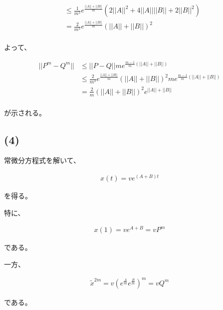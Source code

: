\documentclass[a4paper, 10pt, dvipdfmx]{jlreq}
\begin{document}
\begin{align*}
            & \leq \frac{1}{m^2}e^{\frac{||A||+||B||}{m}} \left(2||A||^2+4||A||||B||+2||B||^2 \right)                                                                                                                                                                                                            \\
            & = \frac{2}{m^2}e^{\frac{||A||+||B||}{m}} \left(||A||+||B||\right)^2                                                                                                                                                                                                                                \\
\end{align*}

よって、

\begin{align*}
    ||P^m-Q^m|| & \leq ||P-Q||m e^{\frac{m-1}{m}(||A||+||B||)}                                                            \\
                & \leq \frac{2}{m^2}e^{\frac{||A||+||B||}{m}} \left(||A||+||B||\right)^2 m e^{\frac{m-1}{m}(||A||+||B||)} \\
                & = \frac{2}{m} \left(||A||+||B||\right)^2 e^{||A||+||B||}                                                \\
\end{align*}

が示される。

\subsection*{(4)}

常微分方程式を解いて、

\begin{align*}
    x(t)=ve^{(A+B)t}
\end{align*}

を得る。

特に、

\begin{align*}
    x(1)=ve^{A+B}=v P^m
\end{align*}

である。

一方、

\begin{align*}
    \tilde{x}^{2m}=v\left(e^{\frac{A}{m}}e^{\frac{B}{m}}\right)^m=vQ^m
\end{align*}

である。
\end{document}
